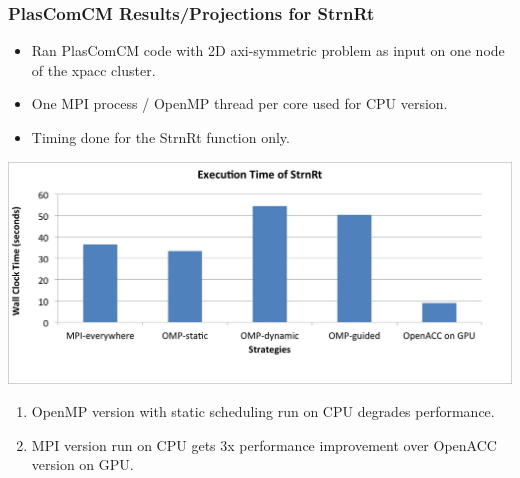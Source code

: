 
\begin{frame}[label=strnrt]
\frametitle{PlasComCM Results/Projections for StrnRt} 

\begin{itemize} 
\tiny \item \tiny Ran PlasComCM code with 2D axi-symmetric problem as input on one node of the xpacc
cluster. 
\item \tiny One MPI process / OpenMP thread per core used for CPU
version. 
\item \tiny Timing done for the StrnRt function only. 
\end{itemize} 

\begin{center} 
\includegraphics[scale=0.22]{./plots/StrnRtGPUresults} 
\end{center}

\begin{enumerate} 
\tiny \item \tiny OpenMP version with static scheduling run on CPU degrades performance. 
\item \tiny MPI version run on CPU gets 3x performance improvement
  over OpenACC version on GPU. 
\end{enumerate} 
\end{frame} 

